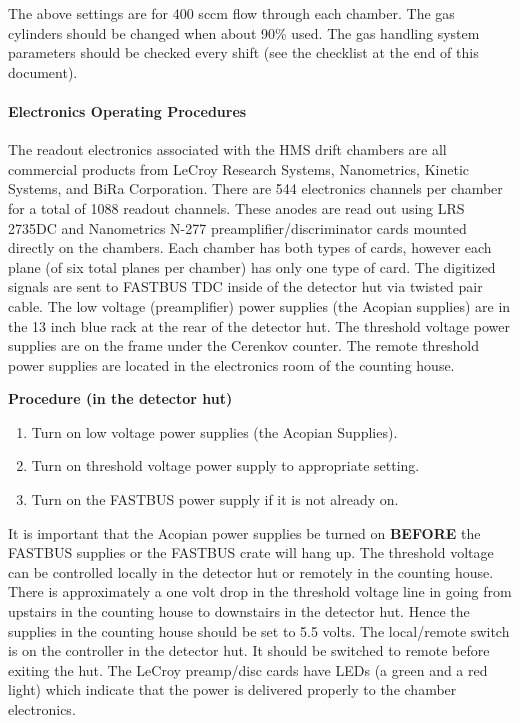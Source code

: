 The above settings are for 400 sccm flow through each chamber.  The gas
cylinders should be changed when about 90\% used.  The gas handling system
parameters should be checked every shift (see the checklist at the end of
this document).

\paragraph{Electronics Operating Procedures}

The readout electronics associated with the HMS drift chambers are all
commercial products from LeCroy Research Systems, Nanometrics, Kinetic Systems,
and BiRa Corporation.  There are 544 electronics channels per chamber for
a total of 1088 readout channels.  These anodes are read out using LRS 2735DC
and Nanometrics N-277 preamplifier/discriminator cards mounted directly
on the chambers.  Each chamber has both types of cards, however each plane
(of six total planes per chamber) has only one type of card.  The
digitized signals are sent to FASTBUS TDC inside of the detector hut
via twisted pair cable.  The low voltage (preamplifier) power supplies
(the Acopian supplies)
are in the 13 inch blue rack at the rear of the detector hut.  The
threshold voltage power supplies are on the frame under the Cerenkov
counter.  The remote
threshold power supplies are located in the electronics room of the counting
house.

\begin{center}
{\bf Procedure (in the detector hut)}
\end{center}

\begin{enumerate}
\item {Turn on low voltage power supplies (the Acopian Supplies).}
\item {Turn on threshold voltage power supply to appropriate setting.}
\item {Turn on the FASTBUS power supply if it is not already on.}
\end{enumerate}

It is important that the Acopian power supplies be turned on {\bf BEFORE} the
FASTBUS supplies or the FASTBUS crate will hang up.  The threshold voltage
can be controlled locally in the detector hut or remotely in the
counting house. There is approximately a one volt drop in the threshold
voltage line in going from upstairs in the counting house to
downstairs in the detector hut.  Hence the supplies in the counting
house should be set to 5.5 volts. The local/remote switch is on the
controller in the
detector hut.  It should be switched to remote before exiting the hut.  The
LeCroy preamp/disc cards have LEDs (a green and a red light) which indicate
that the power is delivered properly to the chamber electronics.

